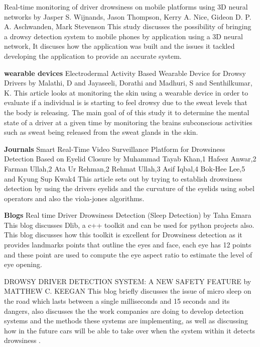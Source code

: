 Real-time monitoring of driver drowsiness on mobile platforms using 3D neural networks by Jasper S. Wijnands, Jason Thompson, Kerry A. Nice, Gideon D. P. A. Aschwanden, Mark Stevenson \cite{study} This study discusses the possibility of bringing a drowsy detection system to mobile phones by application using a 3D neural network, It discuses how the application was built and the issues it tackled developing the application to provide an accurate system.


\textbf{wearable devices }
 Electrodermal Activity Based Wearable Device for Drowsy Drivers by Malathi, D and Jayaseeli, Dorathi and Madhuri, S and  Senthilkumar, K.     \cite{article2 } This article looks at monitoring the skin using a wearable device in order to evaluate if a individual is is starting to feel drowsy due to the sweat levels that the body is releasing. The main goal of of this study it to determine the mental state of a driver at a given time by monitoring the brains subconscious activities such as sweat being released from the sweat glands in the skin.
 

\textbf{ Journals}
Smart Real-Time Video Surveillance Platform for Drowsiness Detection Based on Eyelid Closure by Muhammad Tayab Khan,1 Hafeez Anwar,2 Farman Ullah,2 Ata Ur Rehman,2 Rehmat Ullah,3 Asif Iqbal,4 Bok-Hee Lee,5 and Kyung Sup Kwak4\cite{journal} This article sets out by trying to establish drowsiness detection by using the drivers eyelids and the curvature of the eyelids using sobel operators and also the viola-jones algorithms. 

\textbf{Blogs}
Real time Driver Drowsiness Detection (Sleep Detection) by Taha Emara\cite{blog1} This blog discusses Dlib, a c++ toolkit and can be used for python projects also. This blog discusses how this toolkit is excellent for Drowsiness detection as it provides landmarks points that outline the eyes and face, each eye has 12 points and these point are used to compute the eye aspect ratio to estimate the level of eye opening.

DROWSY DRIVER DETECTION SYSTEM: A NEW SAFETY FEATURE by MATTHEW C. KEEGAN\cite{blog2} This blog briefly discusses the issue of micro sleep on the road which lasts between a single milliseconds and 15 seconds and its dangers, also discusses the the work companies are doing to develop detection systems and the methods these systems are implementing, as well as discussing how in the future cars will be able to take over when the system within it detects drowsiness .

